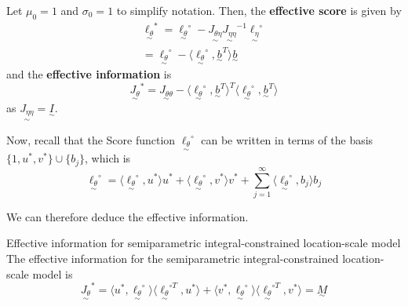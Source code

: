 \documentclass[twoside]{article}
\newcommand{\utilde}{\underset{\sim}}
\begin{document}
Let $\mu_0 = 1$ and $\sigma_0 = 1$ to simplify notation. Then, the \textbf{effective score} is given by 
\begin{align}
\utilde{\ell_{\theta}}^{*} = \utilde{\ell_{\theta}}^{\circ} - \utilde{J_{\theta \eta}}\utilde{J_{\eta \eta}}^{-1}\utilde{\ell_{\eta}}^{\circ}
\\ = \utilde{\ell_{\theta}}^{\circ} - \langle \utilde{\ell_{\theta}}^{\circ}, \utilde{b}^{T} \rangle \utilde{b}
\end{align}
and the \textbf{effective information} is 
$$
\utilde{J_{\theta}}^{*} = \utilde{J_{\theta \theta}} - \langle \utilde{\ell_{\theta}}^{\circ}, \utilde{b}^{T} \rangle^T \langle \utilde{\ell_{\theta}}^{\circ}, \utilde{b}^{T} \rangle
$$
as $\utilde{J_{\eta \eta}} = \utilde{I}.$

Now, recall that the Score function $\utilde{\ell_{\theta}}^{\circ}$ can be written in terms of the basis $\{1, u^{*}, v^{*}\} \cup \{b_j\}$, which is 
$$
\utilde{\ell_{\theta}}^{\circ} = \langle \utilde{\ell_{\theta}}^{\circ}, u^*\rangle u^* + \langle \utilde{\ell_{\theta}}^{\circ}, v^*\rangle v^* + \sum_{j=1}^{\infty}\langle \utilde{\ell_{\theta}}^{\circ}, b_j \rangle b_j
$$

We can therefore deduce the effective information.

\begin{theorem_exam}{Effective information for semiparametric integral-constrained location-scale model}{} The effective information for the semiparametric integral-constrained location-scale model is 
\begin{equation}
  \utilde{J_{\theta}}^{*} = \langle u^*, \utilde{\ell_{\theta}}^{\circ}\rangle \langle \utilde{\ell_{\theta}}^{\circ T}, u^*\rangle + \langle v^*, \utilde{\ell_{\theta}}^{\circ}\rangle \langle \utilde{\ell_{\theta}}^{\circ T}, v^* \rangle = \utilde{M}
\end{equation}
\end{theorem_exam}
\end{document}
